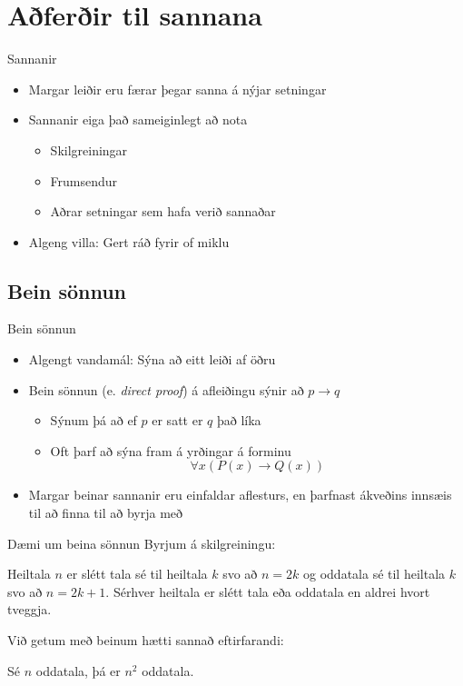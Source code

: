 \documentclass[handout]{beamer}
\begin{document}
\section{Aðferðir til sannana}

\begin{frame}{Sannanir}
    \begin{itemize}
        \item Margar leiðir eru færar þegar sanna á nýjar setningar
        \item Sannanir eiga það sameiginlegt að nota
        \begin{itemize}
            \item Skilgreiningar
            \item Frumsendur
            \item Aðrar setningar sem hafa verið sannaðar
        \end{itemize}
        \item Algeng villa: Gert ráð fyrir of miklu
    \end{itemize}
\end{frame}

\subsection{Bein sönnun}

\begin{frame}{Bein sönnun}
    \begin{itemize}
        \item Algengt vandamál: Sýna að eitt leiði af öðru
        \item Bein sönnun (e. \emph{direct proof}) á afleiðingu sýnir að $p \to q$
        \begin{itemize}
            \item Sýnum þá að ef $p$ er satt er $q$ það líka
            \item Oft þarf að sýna fram á yrðingar á forminu \[\forall x (P(x) \to Q(x))\]
        \end{itemize}
        \item Margar beinar sannanir eru einfaldar aflesturs, en þarfnast ákveðins innsæis til að finna til að byrja með
    \end{itemize}
\end{frame}

\begin{frame}{Dæmi um beina sönnun}
    Byrjum á skilgreiningu:
    \begin{tcolorbox}[title=Oddatölur og sléttar tölur]
        Heiltala $n$ er slétt tala sé til heiltala $k$ svo að $n = 2k$ og oddatala sé til heiltala $k$ svo að $n = 2k+1$. Sérhver heiltala er slétt tala eða oddatala en aldrei hvort tveggja.
    \end{tcolorbox}
    Við getum með beinum hætti sannað eftirfarandi:
    \begin{tcolorbox}
        Sé $n$ oddatala, þá er $n^2$ oddatala.
    \end{tcolorbox}
\end{frame}
\end{document}
